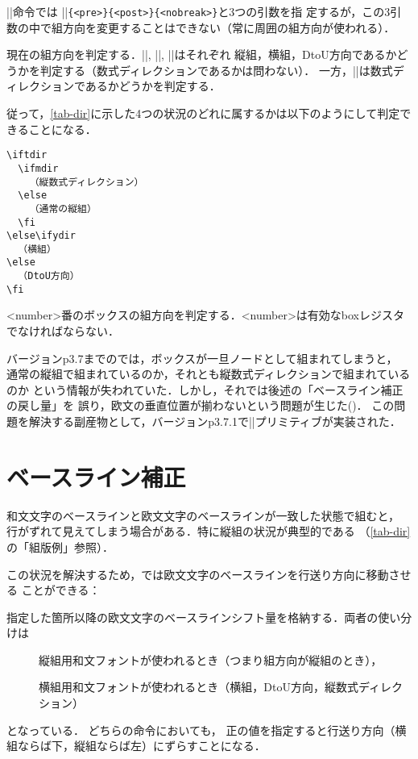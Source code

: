 \documentclass[a4paper,11pt,nomag,dvipdfmx]{jsarticle}
\begin{document}
\begin{dangerous}
 |\discretionary|命令では
|\discretionary|\texttt{\{<pre>\}\{<post>\}\{<nobreak>\}}と3つの引数を指
 定するが，この3引数の中で組方向を変更することはできない（常に周囲の組方向が使われる）．
\end{dangerous}

\begin{cslist}
  現在の組方向を判定する．|\iftdir|, |\ifydir|, |\ifddir|はそれぞれ
  縦組，横組，DtoU方向であるかどうかを判定する（数式ディレクションであるかは問わない）．
  一方，|\ifmdir|は数式ディレクションであるかどうかを判定する．

  従って，\autoref{tab-dir}に示した4つの状況のどれに属するかは以下のようにして判定できることになる．
  \begin{verbatim}
\iftdir
  \ifmdir
    （縦数式ディレクション）
  \else
    （通常の縦組）
  \fi
\else\ifydir
  （横組）
\else
  （DtoU方向）
\fi
  \end{verbatim}

  <number>番のボックスの組方向を判定する．<number>は有効なboxレジスタでなければならない．

  バージョンp3.7までの\pTeX では，ボックスが一旦ノードとして組まれてしまうと，
  通常の縦組で組まれているのか，それとも縦数式ディレクションで組まれているのか
  という情報が失われていた．しかし，それでは後述の「ベースライン補正の戻し量」を
  誤り，欧文の垂直位置が揃わないという問題が生じた(\cite{tatemath})．
  この問題を解決する副産物として，バージョンp3.7.1で|\ifmbox|プリミティブが実装された．
\end{cslist}

\section{ベースライン補正}
\label{sec:baselineshift}

和文文字のベースラインと欧文文字のベースラインが一致した状態で組むと，
行がずれて見えてしまう場合がある．特に縦組の状況が典型的である
（\autoref{tab-dir}の「組版例」参照）．

この状況を解決するため，\pTeX では欧文文字のベースラインを行送り方向に移動させる
ことができる：

\begin{cslist}
\csitem[\.{tbaselineshift}=<dimen>, \.{ybaselineshift}=<dimen>]
 指定した箇所以降の欧文文字のベースラインシフト量を格納する．両者の使い分けは
 \begin{description}
  \item[\texttt{\string\tbaselineshift}]
         縦組用和文フォントが使われるとき（つまり組方向が縦組のとき），
  \item[\texttt{\string\ybaselineshift}]
         横組用和文フォントが使われるとき（横組，DtoU方向，縦数式ディレクション）
 \end{description}
 となっている．
 どちらの命令においても，
 正の値を指定すると行送り方向（横組ならば下，縦組ならば左）にずらすことになる．
\end{cslist}
\end{document}
